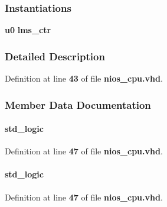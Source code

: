 \subsubsection*{Instantiations}
 \begin{DoxyCompactItemize}
\item 
{\bf u0}  {\bfseries lms\+\_\+ctr}   
\end{DoxyCompactItemize}


\subsubsection{Detailed Description}


Definition at line {\bf 43} of file {\bf nios\+\_\+cpu.\+vhd}.



\subsubsection{Member Data Documentation}
\paragraph[{adf\+\_\+\+M\+O\+SI}]{ {\bfseries \textcolor{comment}{std\+\_\+logic}\textcolor{vhdlchar}{ }} \hspace{0.3cm}{\ttfamily [Signal]}}\label{classnios__cpu_1_1arch_aee367c9b67c564d31312cc45a2f90267}


Definition at line {\bf 47} of file {\bf nios\+\_\+cpu.\+vhd}.

\paragraph[{adf\+\_\+\+S\+C\+LK}]{ {\bfseries \textcolor{comment}{std\+\_\+logic}\textcolor{vhdlchar}{ }} \hspace{0.3cm}{\ttfamily [Signal]}}\label{classnios__cpu_1_1arch_a9adf427950fd391a67862b847818668e}


Definition at line {\bf 47} of file {\bf nios\+\_\+cpu.\+vhd}.

